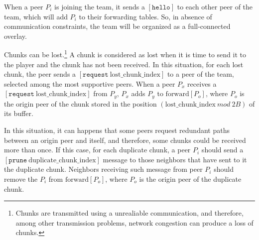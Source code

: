 
\label{sec:team_organization}

When a peer $P_i$ is joining the team, it sends a $[\mathtt{hello}]$
to each other peer of the team, which will add $P_i$ to their
forwarding tables. So, in absence of communication constraints, the
team will be organized as a full-connected overlay.


Chunks can be lost.\footnote{Chunks are transmitted using a
  unrealiable communication, and therefore, among other transmission
  problems, network congestion can produce a loss of chunks.} A chunk
is considered as lost when it is time to send it to the player and the
chunk has not been received.  In this situation, for each lost chunk,
the peer sends a $[\mathtt{request}~\text{lost\_chunk\_index}]$ to a
peer of the team, selected among the most supportive peers. When a
peer $P_x$ receives a $[\mathtt{request}~\text{lost\_chunk\_index}]$
from $P_y$, $P_x$ adds $P_y$ to $\text{forward}[P_o]$, where $P_o$ is
the origin peer of the chunk stored in the position
$(\text{lost\_chunk\_index}~\mathit{mod}~2B)$ of its buffer.

\begin{comment}
origin peer of the next chunk stored in the
buffer. This peer has to characteristics: (1) it is not necessary a
neighbor peer, and (2) there is a high probability that this chunk has
been stored in the buffer ``for a long time'', so, if it is not a
neighbor, the link between it and the peer is working fairly well.
\end{comment}

  
In this situation, it can happens that some peers request
redundant paths between an origin peer and itself, and therefore, some
chunks could be received more than once. If this case, for each
duplicate chunk, a peer $P_i$ should send a $[\mathtt{prune}~\text{duplicate\_chunk\_index}]$ message to those neighbors that
have sent to it the duplicate chunk. Neighbors receiving such message
from peer $P_i$ should remove the $P_i$ from $\text{forward}[P_o]$,
where $P_o$ is the origin peer of the duplicate chunk.

